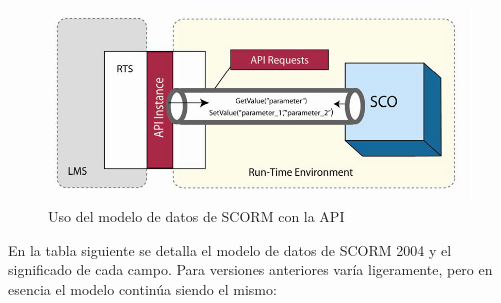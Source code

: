 \begin{figure}[H]
\centering
\includegraphics*[width=\textwidth]{figures/SCORM_Data_Model_API.png} 
\caption{Uso del modelo de datos de SCORM con la API \cite{RTE2004}}
\end{figure}
En la tabla siguiente se detalla el modelo de datos de SCORM 2004 y el significado de cada campo. Para versiones anteriores varía ligeramente, pero en esencia el modelo continúa siendo el mismo:
